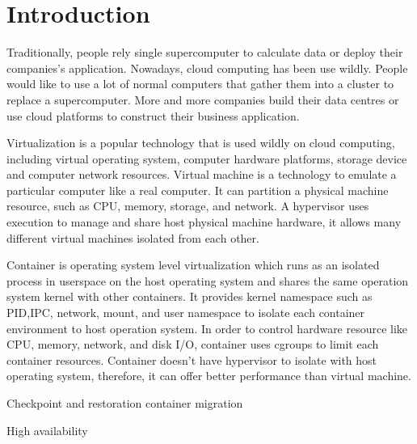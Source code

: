 \chapter{Introduction}
\label{chap:intro}
Traditionally, people rely single supercomputer to calculate data or deploy their companies's application. Nowadays, cloud computing has been use wildly. People would like to use a lot of normal computers that gather them into a cluster to replace a supercomputer. More and more companies build their data centres or use cloud platforms to construct their business application.

Virtualization is a popular technology that is used wildly on cloud computing,  including virtual operating system, computer hardware platforms, storage device and computer network resources.
Virtual machine is a technology to emulate a particular computer like a real computer. It can partition a physical machine resource, such as CPU, memory, storage, and network.
A hypervisor uses execution to manage and share host physical machine hardware, it allows many different virtual machines isolated from each other.

Container is operating system level virtualization which runs as an isolated process in userspace on the host operating system and shares the same operation system kernel with other containers.
It provides kernel namespace such as PID,IPC, network, mount, and user namespace to isolate each container environment to host operation system.
In order to control hardware resource like CPU, memory, network, and disk I/O, container uses cgroups to limit each container resources.
Container doesn't have hypervisor to isolate with host operating system, therefore, it can offer better performance than virtual machine.

Checkpoint and restoration  container migration

High availability